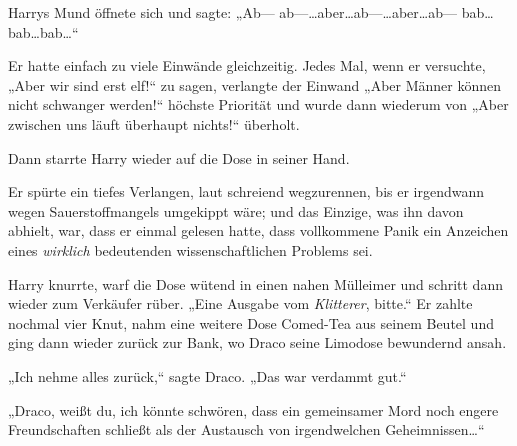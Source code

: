 Harrys Mund öffnete sich und sagte: „Ab— ab—…aber…ab—…aber…ab— bab…bab…bab…“

Er hatte einfach zu viele Einwände gleichzeitig. Jedes Mal, wenn er versuchte, „Aber wir sind erst elf!“ zu sagen, verlangte der Einwand „Aber Männer können nicht schwanger werden!“ höchste Priorität und wurde dann wiederum von „Aber zwischen uns läuft überhaupt nichts!“ überholt.

Dann starrte Harry wieder auf die Dose in seiner Hand.

Er spürte ein tiefes Verlangen, laut schreiend wegzurennen, bis er irgendwann wegen Sauerstoffmangels umgekippt wäre; und das Einzige, was ihn davon abhielt, war, dass er einmal gelesen hatte, dass vollkommene Panik ein Anzeichen eines \emph{wirklich} bedeutenden wissenschaftlichen Problems sei.

Harry knurrte, warf die Dose wütend in einen nahen Mülleimer und schritt dann wieder zum Verkäufer rüber. „Eine Ausgabe vom \emph{Klitterer}, bitte.“ Er zahlte nochmal vier Knut, nahm eine weitere Dose Comed-Tea aus seinem Beutel und ging dann wieder zurück zur Bank, wo Draco seine Limodose bewundernd ansah.

„Ich nehme alles zurück,“ sagte Draco. „Das war verdammt gut.“

„Draco, weißt du, ich könnte schwören, dass ein gemeinsamer Mord noch engere Freundschaften schließt als der Austausch von irgendwelchen Geheimnissen…“

